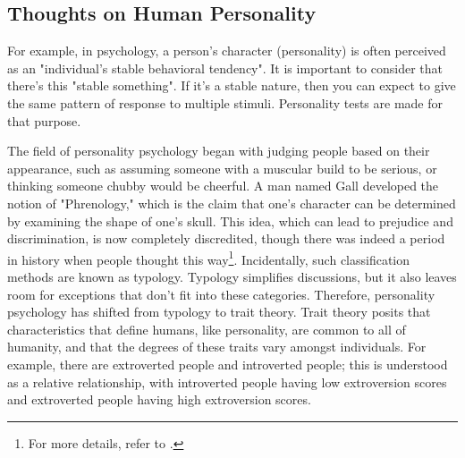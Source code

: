 \documentclass{ltjbook}
\begin{document}
\subsection{Thoughts on Human Personality}
For example, in psychology, a person’s character (personality) is often perceived as an "individual’s stable behavioral tendency". It is important to consider that there’s this "stable something". If it’s a stable nature, then you can expect to give the same pattern of response to multiple stimuli. Personality tests are made for that purpose.

The field of personality psychology began with judging people based on their appearance, such as assuming someone with a muscular build to be serious, or thinking someone chubby would be cheerful. A man named Gall developed the notion of "Phrenology," which is the claim that one's character can be determined by examining the shape of one's skull. This idea, which can lead to prejudice and discrimination, is now completely discredited, though there was indeed a period in history when people thought this way\footnote{For more details, refer to \textcite{Watanabe2019}.}. Incidentally, such classification methods are known as typology. Typology simplifies discussions, but it also leaves room for exceptions that don't fit into these categories. Therefore, personality psychology has shifted from typology to trait theory. Trait theory posits that characteristics that define humans, like personality, are common to all of humanity, and that the degrees of these traits vary amongst individuals. For example, there are extroverted people and introverted people; this is understood as a relative relationship, with introverted people having low extroversion scores and extroverted people having high extroversion scores\parencite{Oshio2020}.
\end{document}
